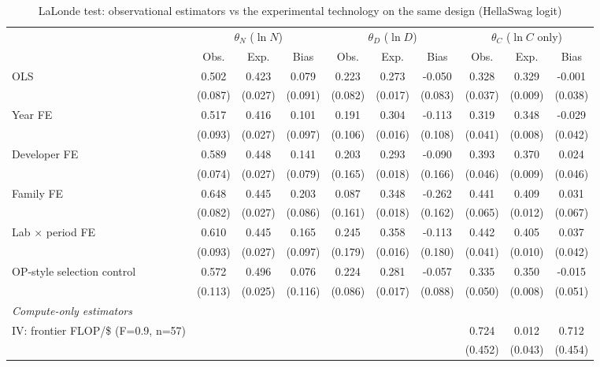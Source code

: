 \begin{table}[!htbp]
\centering
\scriptsize
\begin{threeparttable}
\caption{LaLonde test: observational estimators vs the experimental technology on the same design (HellaSwag logit)}
\label{tab:table6_lalonde}
\begin{tabular}{lccccccccc}
\toprule
\multicolumn{1}{c}{} & \multicolumn{3}{c}{$\theta_N$ ($\ln N$)} & \multicolumn{3}{c}{$\theta_D$ ($\ln D$)} & \multicolumn{3}{c}{$\theta_C$ ($\ln C$ only)} \\ \cmidrule(lr){2-4}\cmidrule(lr){5-7}\cmidrule(lr){8-10}
 & Obs. & Exp. & Bias & Obs. & Exp. & Bias & Obs. & Exp. & Bias \\
\midrule
OLS & 0.502 & 0.423 & 0.079 & 0.223 & 0.273 & -0.050 & 0.328 & 0.329 & -0.001 \\
 & (0.087) & (0.027) & (0.091) & (0.082) & (0.017) & (0.083) & (0.037) & (0.009) & (0.038) \\
Year FE & 0.517 & 0.416 & 0.101 & 0.191 & 0.304 & -0.113 & 0.319 & 0.348 & -0.029 \\
 & (0.093) & (0.027) & (0.097) & (0.106) & (0.016) & (0.108) & (0.041) & (0.008) & (0.042) \\
Developer FE & 0.589 & 0.448 & 0.141 & 0.203 & 0.293 & -0.090 & 0.393 & 0.370 & 0.024 \\
 & (0.074) & (0.027) & (0.079) & (0.165) & (0.018) & (0.166) & (0.046) & (0.009) & (0.046) \\
Family FE & 0.648 & 0.445 & 0.203 & 0.087 & 0.348 & -0.262 & 0.441 & 0.409 & 0.031 \\
 & (0.082) & (0.027) & (0.086) & (0.161) & (0.018) & (0.162) & (0.065) & (0.012) & (0.067) \\
Lab $\times$ period FE & 0.610 & 0.445 & 0.165 & 0.245 & 0.358 & -0.113 & 0.442 & 0.405 & 0.037 \\
 & (0.093) & (0.027) & (0.097) & (0.179) & (0.016) & (0.180) & (0.041) & (0.010) & (0.042) \\
OP-style selection control & 0.572 & 0.496 & 0.076 & 0.224 & 0.281 & -0.057 & 0.335 & 0.350 & -0.015 \\
 & (0.113) & (0.025) & (0.116) & (0.086) & (0.017) & (0.088) & (0.050) & (0.008) & (0.051) \\
\midrule
\multicolumn{10}{l}{\textit{Compute-only estimators}} \\
IV: frontier FLOP/\$ (F=0.9, n=57) &  &  &  &  &  &  & 0.724 & 0.012 & 0.712 \\
 &  &  &  &  &  &  & (0.452) & (0.043) & (0.454) \\

\end{tabular}
\end{threeparttable}
\end{table}
